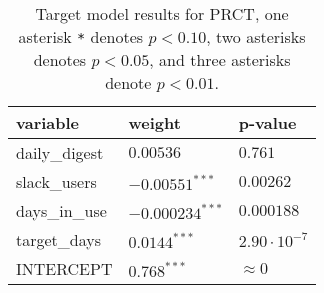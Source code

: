 \renewcommand{\arraystretch}{1.2}
\begin{table}
\begin{center}
\begin{tabular}{|p{4cm}|p{4cm}|p{4cm}|} 
\hline
variable & weight & p-value \\ [0.5ex]
\hline\hline

daily\_digest & $0.00536^{}$ & $0.761$ \\
slack\_users & $-0.00551^{***}$ & $0.00262$ \\
days\_in\_use & $-0.000234^{***}$ & $0.000188$ \\
target\_days & $0.0144^{***}$ & $2.90\cdot10^{-7}$ \\

\hline\hline
INTERCEPT & $0.768^{***}$ & $\approx0$ \\ 

\hline
\end{tabular}
\caption{Target model results for PRCT, one asterisk \texttt{*} denotes  $p < 0.10$, two asterisks denotes $p < 0.05$, and three asterisks denote $p < 0.01$.}
\label{tab:target-prct-results}
\end{center}
\end{table}